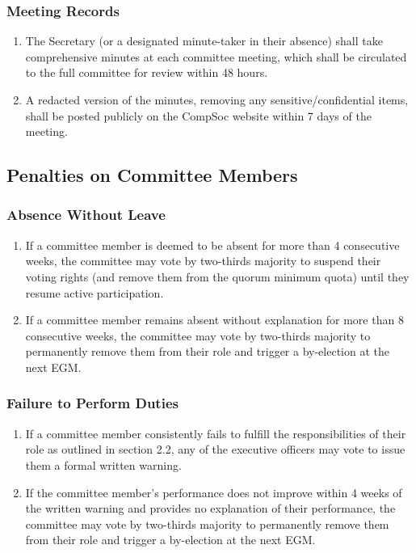\subsubsection{Meeting Records}
\begin{enumerate}
    \item The Secretary (or a designated minute-taker in their absence) shall take comprehensive minutes at each committee meeting, which shall be circulated to the full committee for review within 48 hours.
    \item A redacted version of the minutes, removing any sensitive/confidential items, shall be posted publicly on the CompSoc website within 7 days of the meeting.
\end{enumerate}

\subsection{Penalties on Committee Members}
\subsubsection{Absence Without Leave}
\begin{enumerate}
\item If a committee member is deemed to be absent for more than 4 consecutive weeks, the committee may vote by two-thirds majority to suspend their voting rights (and remove them from the quorum minimum quota) until they resume active participation.
\item If a committee member remains absent without explanation for more than 8 consecutive weeks, the committee may vote by two-thirds majority to permanently remove them from their role and trigger a by-election at the next EGM.
\end{enumerate}

\subsubsection{Failure to Perform Duties}
\begin{enumerate}
\item If a committee member consistently fails to fulfill the responsibilities of their role as outlined in section 2.2, any of the executive officers may vote to issue them a formal written warning.
\item If the committee member's performance does not improve within 4 weeks of the written warning and provides no explanation of their performance, the committee may vote by two-thirds majority to permanently remove them from their role and trigger a by-election at the next EGM.
\end{enumerate}

